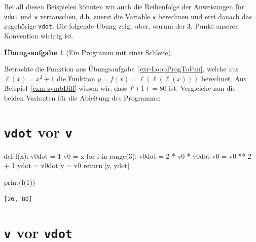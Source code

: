 \documentclass[
  a4paper,
  DIV=11]{scrreprt}
\newenvironment{Shaded}{\begin{snugshade}}{\end{snugshade}}
\newcommand{\BuiltInTok}[1]{\textcolor[rgb]{0.00,0.23,0.31}{#1}}
\newcommand{\ControlFlowTok}[1]{\textcolor[rgb]{0.00,0.23,0.31}{#1}}
\newcommand{\DecValTok}[1]{\textcolor[rgb]{0.68,0.00,0.00}{#1}}
\newcommand{\KeywordTok}[1]{\textcolor[rgb]{0.00,0.23,0.31}{#1}}
\newcommand{\NormalTok}[1]{\textcolor[rgb]{0.00,0.23,0.31}{#1}}
\newcommand{\OperatorTok}[1]{\textcolor[rgb]{0.37,0.37,0.37}{#1}}
\theoremstyle{definition}
\newtheorem{exercise}{Übungsaufgabe}[chapter]
\theoremstyle{definition}
\theoremstyle{remark}
\begin{document}
Bei all diesen Beispielen könnten wir auch die Reihenfolge der
Anweisungen für \texttt{vdot} und \texttt{v} vertauschen, d.h. zuerst
die Variable \texttt{v} berechnen und erst danach das zugehörige
\texttt{vdot}. Die folgende Übung zeigt aber, warum der 3. Punkt unserer
Konvention wichtig ist.

\begin{exercise}[Ein Programm mit einer
Schleife]\protect\hypertarget{exr-SADmitSchleife}{}\label{exr-SADmitSchleife}

Betrachte die Funktion aus Übungsaufgabe~\ref{exr-LoopProgToFun}, welche
aus \(\ell(x) = x^2 + 1\) die Funktion
\(y = f(x) = \ell(\ell(\ell(x)))\) berechnet. Aus
Beispiel~\ref{exm-symbDiff} wissen wir, dass \(f'(1) = 80\) ist.
Vergleiche nun die beiden Varianten für die Ableitung des Programms:

\section{\texorpdfstring{\texttt{vdot} vor \texttt{v}}{vdot vor v}}

\begin{Shaded}
\begin{Highlighting}[]
\KeywordTok{def}\NormalTok{ f(x):}
\NormalTok{    v0dot }\OperatorTok{=} \DecValTok{1}
\NormalTok{    v0 }\OperatorTok{=}\NormalTok{ x}
    \ControlFlowTok{for}\NormalTok{ i }\KeywordTok{in} \BuiltInTok{range}\NormalTok{(}\DecValTok{3}\NormalTok{):}
\NormalTok{        v0dot }\OperatorTok{=} \DecValTok{2} \OperatorTok{*}\NormalTok{ v0 }\OperatorTok{*}\NormalTok{ v0dot}
\NormalTok{        v0 }\OperatorTok{=}\NormalTok{ v0 }\OperatorTok{**} \DecValTok{2} \OperatorTok{+} \DecValTok{1}
\NormalTok{    ydot }\OperatorTok{=}\NormalTok{ v0dot}
\NormalTok{    y }\OperatorTok{=}\NormalTok{ v0}
    \ControlFlowTok{return}\NormalTok{ [y, ydot]}

\BuiltInTok{print}\NormalTok{(f(}\DecValTok{1}\NormalTok{))}
\end{Highlighting}
\end{Shaded}

\begin{verbatim}
[26, 80]
\end{verbatim}

\section{\texorpdfstring{\texttt{v} vor \texttt{vdot}}{v vor vdot}}


\end{exercise}
\end{document}
